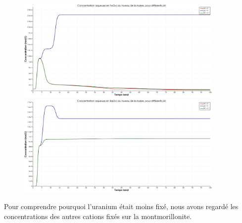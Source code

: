 \documentclass{article}
\begin{document}
\begin{figure}[H]
    \centering
    \begin{minipage}{0.5\textwidth}
        \centering
        \includegraphics[width=0.9\textwidth]{III_B_2_13.png} 
        \caption{}
        \label{fig:Fe_riviere_comparaison}
    \end{minipage}\hfill
    \begin{minipage}{0.5\textwidth}
        \centering
        \includegraphics[width=0.9\textwidth]{III_B_2_14.png} 
        \caption{}
        \label{fig:Ba_rivier_comparaison}
    \end{minipage}
\end{figure}

Pour comprendre pourquoi l’uranium était moins fixé, nous avons regardé les concentrations des autres cations fixés sur la montmorillonite.
\end{document}
